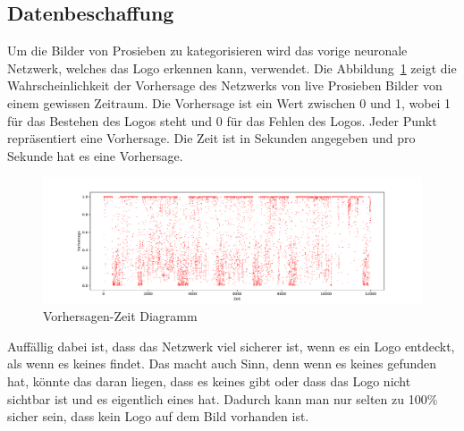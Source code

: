 \documentclass[12pt,a4paper]{report}
\begin{document}
\subsection{Datenbeschaffung}\label{subsec:datenbeschaffung}
Um die Bilder von Prosieben zu kategorisieren wird das vorige neuronale Netzwerk,
welches das Logo erkennen kann, verwendet.
Die Abbildung~\ref{fig:points} zeigt die Wahrscheinlichkeit der Vorhersage des Netzwerks von live Prosieben Bilder von einem gewissen Zeitraum.
Die Vorhersage ist ein Wert zwischen 0 und 1, wobei 1 für das Bestehen des Logos steht und 0 für das Fehlen des Logos.
Jeder Punkt repräsentiert eine Vorhersage.
Die Zeit ist in Sekunden angegeben und pro Sekunde hat es eine Vorhersage.
\begin{figure}[h]%
    \centering
    \includegraphics[width=1.0\textwidth]{assets/python/points.pdf}%
    \caption{Vorhersagen-Zeit Diagramm}%
    \label{fig:points}%
\end{figure}
Auffällig dabei ist, dass das Netzwerk viel sicherer ist, wenn es ein Logo entdeckt, als wenn es keines findet.
Das macht auch Sinn, denn wenn es keines gefunden hat, könnte das daran liegen,
dass es keines gibt oder dass das Logo nicht sichtbar ist und es eigentlich eines hat.
Dadurch kann man nur selten zu 100\% sicher sein, dass kein Logo auf dem Bild vorhanden ist.
\end{document}
